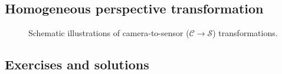 \documentclass[draft]{CVCN}
\begin{document}
\subsection{Homogeneous perspective transformation}

\begin{figure}
    \centering
    
    \caption{Schematic illustrations of camera-to-sensor (\(\mathcal{C}\rightarrow\mathcal{S}\)) transformations.}%
    \label{fig:homocoords-perspectivetransform}
\end{figure}


\subsection{Exercises and solutions}

\printsolutions\
\end{document}
